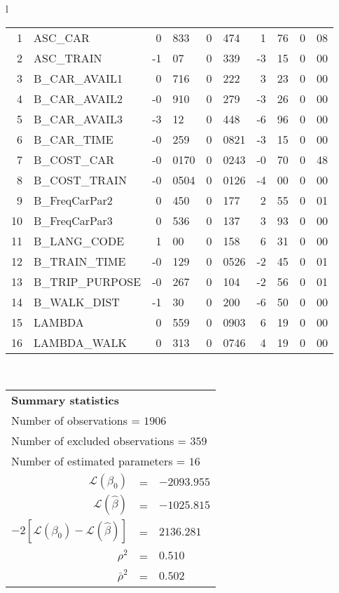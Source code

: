 \begin{tabular}{l}
\begin{tabular}{rlr@{.}lr@{.}lr@{.}lr@{.}l}
1 & ASC_CAR & 0&833 & 0&474 & 1&76 & 0&08\\
2 & ASC_TRAIN & -1&07 & 0&339 & -3&15 & 0&00\\
3 & B_CAR_AVAIL1 & 0&716 & 0&222 & 3&23 & 0&00\\
4 & B_CAR_AVAIL2 & -0&910 & 0&279 & -3&26 & 0&00\\
5 & B_CAR_AVAIL3 & -3&12 & 0&448 & -6&96 & 0&00\\
6 & B_CAR_TIME & -0&259 & 0&0821 & -3&15 & 0&00\\
7 & B_COST_CAR & -0&0170 & 0&0243 & -0&70 & 0&48\\
8 & B_COST_TRAIN & -0&0504 & 0&0126 & -4&00 & 0&00\\
9 & B_FreqCarPar2 & 0&450 & 0&177 & 2&55 & 0&01\\
10 & B_FreqCarPar3 & 0&536 & 0&137 & 3&93 & 0&00\\
11 & B_LANG_CODE & 1&00 & 0&158 & 6&31 & 0&00\\
12 & B_TRAIN_TIME & -0&129 & 0&0526 & -2&45 & 0&01\\
13 & B_TRIP_PURPOSE & -0&267 & 0&104 & -2&56 & 0&01\\
14 & B_WALK_DIST & -1&30 & 0&200 & -6&50 & 0&00\\
15 & LAMBDA & 0&559 & 0&0903 & 6&19 & 0&00\\
16 & LAMBDA_WALK & 0&313 & 0&0746 & 4&19 & 0&00\\
\hline
\end{tabular}
\\
\begin{tabular}{rcl}
\multicolumn{3}{l}{\bf Summary statistics}\\
\multicolumn{3}{l}{ Number of observations = $1906$} \\
\multicolumn{3}{l}{ Number of excluded observations = $359$} \\
\multicolumn{3}{l}{ Number of estimated  parameters = $16$} \\
 $\mathcal{L}(\beta_0)$ &=&  $-2093.955$ \\
 $\mathcal{L}(\hat{\beta})$ &=& $-1025.815 $  \\
 $-2[\mathcal{L}(\beta_0) -\mathcal{L}(\hat{\beta})]$ &=& $2136.281$ \\
    $\rho^2$ &=&   $0.510$ \\
    $\bar{\rho}^2$ &=&    $0.502$ \\
\end{tabular}
  \end{tabular}
